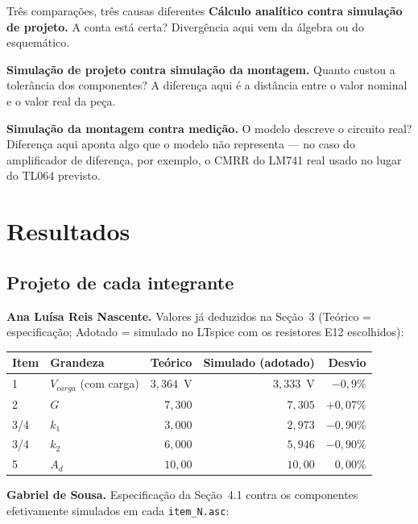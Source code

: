 \documentclass[11pt,a4paper]{article}
\begin{document}
\begin{nota}{Três comparações, três causas diferentes}
\textbf{Cálculo analítico contra simulação de projeto.} A conta está certa? Divergência aqui
vem da álgebra ou do esquemático.

\smallskip
\textbf{Simulação de projeto contra simulação da montagem.} Quanto custou a tolerância dos
componentes? A diferença aqui é a distância entre o valor nominal e o valor real da peça.

\smallskip
\textbf{Simulação da montagem contra medição.} O modelo descreve o circuito real? Diferença
aqui aponta algo que o modelo não representa — no caso do amplificador de diferença, por
exemplo, o CMRR do LM741 real usado no lugar do TL064 previsto.
\end{nota}

\section{Resultados}

\subsection{Projeto de cada integrante}

\textbf{Ana Luísa Reis Nascente.} Valores já deduzidos na Seção~3 (Teórico = especificação;
Adotado = simulado no LTspice com os resistores E12 escolhidos):

\begin{center}
\begin{tabular}{@{}llrrr@{}}
\toprule
\textbf{Item} & \textbf{Grandeza} & \textbf{Teórico} & \textbf{Simulado (adotado)} & \textbf{Desvio} \\
\midrule
1 & $V_{carga}$ (com carga) & $3{,}364$~V & $3{,}333$~V & $-0{,}9\%$ \\
2 & $G$ & $7{,}300$ & $7{,}305$ & $+0{,}07\%$ \\
3/4 & $k_1$ & $3{,}000$ & $2{,}973$ & $-0{,}90\%$ \\
3/4 & $k_2$ & $6{,}000$ & $5{,}946$ & $-0{,}90\%$ \\
5 & $A_d$ & $10{,}00$ & $10{,}00$ & $0{,}00\%$ \\
\bottomrule
\end{tabular}
\end{center}

\textbf{Gabriel de Sousa.} Especificação da Seção~4.1 contra os componentes efetivamente
simulados em cada \texttt{item\_N.asc}:
\end{document}
